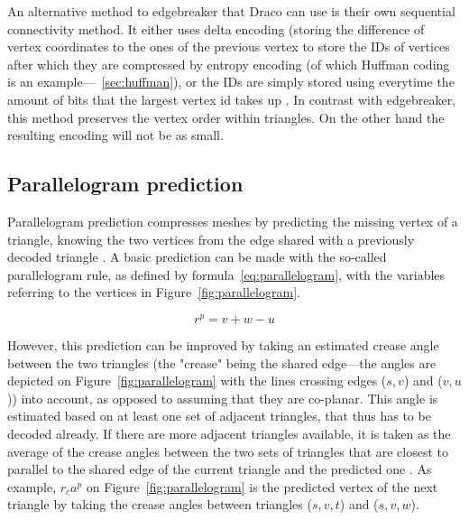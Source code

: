 An alternative method to edgebreaker that Draco can use is their own sequential connectivity method.
It either uses delta encoding (storing the difference of vertex coordinates to the ones of the previous vertex \citep{deering1995geometry} to store the IDs of vertices after which they are compressed by entropy encoding (of which Huffman coding is an example---~\ref{sec:huffman}), or the IDs are simply stored using everytime the amount of bits that the largest vertex id takes up \citep{Google2019}.
In contrast with edgebreaker, this method preserves the vertex order within triangles.
On the other hand the resulting encoding will not be as small.


\subsection{Parallelogram prediction}
\label{sec:parallelogram}
Parallelogram prediction compresses meshes by predicting the missing vertex of a triangle, knowing the two vertices from the edge shared with a previously decoded triangle \citep{gotsman-touma-gi98, Google2018}.
A basic prediction can be made with the so-called parallelogram rule, as defined by formula~\ref{eq:parallelogram}, with the variables referring to the vertices in Figure~\ref{fig:parallelogram}.

\begin{equation}
r^p = v + w - u
\label{eq:parallelogram}
\end{equation}

However, this prediction can be improved by taking an estimated crease angle between the two triangles (the "crease" being the shared edge---the angles are depicted on Figure~\ref{fig:parallelogram} with the lines crossing edges (\(s,v\)) and (\(v,u\))) into account, as opposed to assuming that they are co-planar.
This angle is estimated based on at least one set of adjacent triangles, that thus has to be decoded already.
If there are more adjacent triangles available, it is taken as the average of the crease angles between the two sets of triangles that are closest to parallel to the shared edge of the current triangle and the predicted one \citep{gotsman-touma-gi98}.
As example, \(r_ca^p \) on Figure~\ref{fig:parallelogram} is the predicted vertex of the next triangle by taking the crease angles between triangles (\(s,v,t\)) and (\(s,v,w\)).

